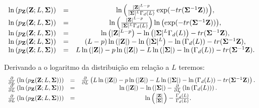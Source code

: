\documentclass[10pt,a4paper]{article}
\begin{document}
\begin{equation}\label{sec41eqn6}
\begin{array}{ccc}
	\ln{\left(p_{{\bf Z}}({\bf Z};L,{\bf \Sigma})\right)}&=&\ln{\left(\frac{|{\bf Z}|^{L-p}}{|{\bf \Sigma}|^{L}\Gamma_d(L)} \exp(-tr({\bf \Sigma}^{-1}{\bf Z}))\right)}, \\
	\ln{\left(p_{{\bf Z}}({\bf Z};L,{\bf \Sigma})\right)}&=&\ln{\left(\frac{|{\bf Z}|^{L-p}}{|{\bf \Sigma}|^{L}\Gamma_d(L)}\right)}\ln{\left( \exp(-tr({\bf \Sigma}^{-1}{\bf Z}))\right)}, \\
	\ln{\left(p_{{\bf Z}}({\bf Z};L,{\bf \Sigma})\right)}&=&\ln{\left(|{\bf Z}|^{L-p}\right)} - \ln{\left(|{\bf \Sigma}|^{L}\Gamma_d(L)\right)}-tr({\bf \Sigma}^{-1}{\bf Z}), \\
	\ln{\left(p_{{\bf Z}}({\bf Z};L,{\bf \Sigma})\right)}&=&(L-p)\ln{\left(|{\bf Z}|\right)} - \ln{\left(|{\bf \Sigma}|^{L}\right)}-\ln{\left(\Gamma_d(L)\right)}-tr({\bf \Sigma}^{-1}{\bf Z}), \\
	\ln{\left(p_{{\bf Z}}({\bf Z};L,{\bf \Sigma})\right)}&=&L\ln{\left(|{\bf Z}|\right)}-p\ln{\left(|{\bf Z}|\right)} - L\ln{\left(|{\bf \Sigma}|\right)}-\ln{\left(\Gamma_d(L)\right)}-tr({\bf \Sigma}^{-1}{\bf Z}). \\
\end{array}
\end{equation}

Derivando a o logaritmo da distribuição em relação a $L$ teremos:
\begin{equation}\label{sec41eqn7}
\begin{array}{ccc}
	\frac{\partial}{\partial L}\left(\ln{\left(p_{{\bf Z}}({\bf Z};L,{\bf \Sigma})\right)}\right)&=&\frac{\partial}{\partial L}\left(L\ln{\left(|{\bf Z}|\right)}-p\ln{\left(|{\bf Z}|\right)} - L\ln{\left(|{\bf \Sigma}|\right)}-\ln{\left(\Gamma_d(L)\right)}-tr({\bf \Sigma}^{-1}{\bf Z})\right). \\
	\frac{\partial}{\partial L}\left(\ln{\left(p_{{\bf Z}}({\bf Z};L,{\bf \Sigma})\right)}\right)&=&\ln{\left(|{\bf Z}|\right)} - \ln{\left(|{\bf \Sigma}|\right)}-\frac{\partial}{\partial L}\left(\ln{\left(\Gamma_d(L)\right)}\right). \\
	\frac{\partial}{\partial L}\left(\ln{\left(p_{{\bf Z}}({\bf Z};L,{\bf \Sigma})\right)}\right)&=&\ln{\left(\frac{|{\bf Z}|}{|{\bf \Sigma}|}\right)} - \frac{\Gamma^{'}_d(L)}{\Gamma_d(L)}. \\
\end{array}
\end{equation}
\end{document}

